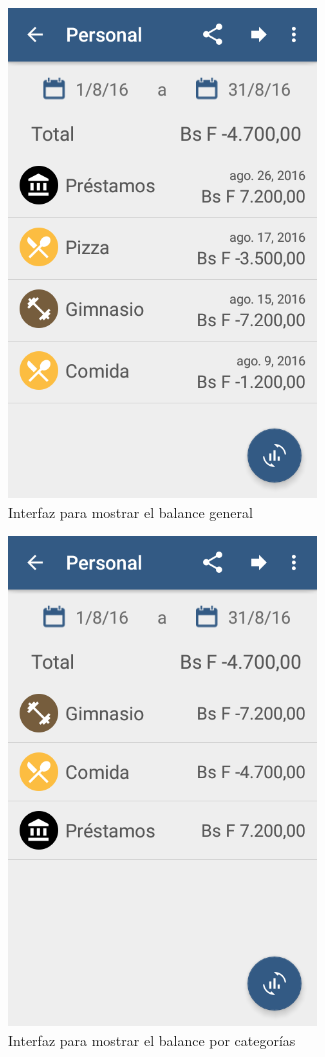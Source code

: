 \begin{figure}[ht]
  \centering
  \includegraphics[scale=0.45,type=png,ext=.png,read=.png]{imagenes/general_report}
  \caption{Interfaz para mostrar el balance general}
  \label{fig:interfazReporteBalanceGeneral}
\end{figure}

\begin{figure}[ht]
  \centering
  \includegraphics[scale=0.45,type=png,ext=.png,read=.png]{imagenes/categories_report}
  \caption{Interfaz para mostrar el balance por categorías}
  \label{fig:interfazReporteCategorias}
\end{figure}

